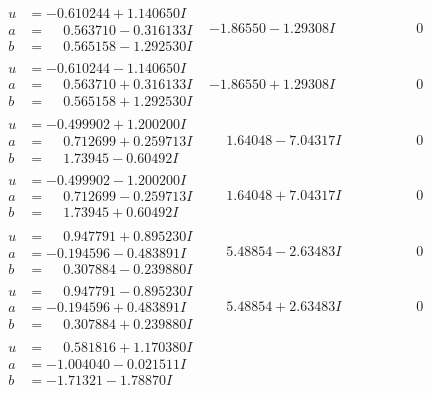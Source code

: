 \documentclass[1p]{elsarticle_modified}
\theoremstyle{definition}
\begin{document}
$$\begin{array}{c|c|c}
\begin{aligned}
u &= -0.610244 + 1.140650 I \\
a &= \phantom{-}0.563710 - 0.316133 I \\
b &= \phantom{-}0.565158 - 1.292530 I\end{aligned}
 & -1.86550 - 1.29308 I & \phantom{-0.000000 } 0 \\ \hline\begin{aligned}
u &= -0.610244 - 1.140650 I \\
a &= \phantom{-}0.563710 + 0.316133 I \\
b &= \phantom{-}0.565158 + 1.292530 I\end{aligned}
 & -1.86550 + 1.29308 I & \phantom{-0.000000 } 0 \\ \hline\begin{aligned}
u &= -0.499902 + 1.200200 I \\
a &= \phantom{-}0.712699 + 0.259713 I \\
b &= \phantom{-}1.73945 - 0.60492 I\end{aligned}
 & \phantom{-}1.64048 - 7.04317 I & \phantom{-0.000000 } 0 \\ \hline\begin{aligned}
u &= -0.499902 - 1.200200 I \\
a &= \phantom{-}0.712699 - 0.259713 I \\
b &= \phantom{-}1.73945 + 0.60492 I\end{aligned}
 & \phantom{-}1.64048 + 7.04317 I & \phantom{-0.000000 } 0 \\ \hline\begin{aligned}
u &= \phantom{-}0.947791 + 0.895230 I \\
a &= -0.194596 - 0.483891 I \\
b &= \phantom{-}0.307884 - 0.239880 I\end{aligned}
 & \phantom{-}5.48854 - 2.63483 I & \phantom{-0.000000 } 0 \\ \hline\begin{aligned}
u &= \phantom{-}0.947791 - 0.895230 I \\
a &= -0.194596 + 0.483891 I \\
b &= \phantom{-}0.307884 + 0.239880 I\end{aligned}
 & \phantom{-}5.48854 + 2.63483 I & \phantom{-0.000000 } 0 \\ \hline\begin{aligned}
u &= \phantom{-}0.581816 + 1.170380 I \\
a &= -1.004040 - 0.021511 I \\
b &= -1.71321 - 1.78870 I\end{aligned}

\end{array}$$
\end{document}
